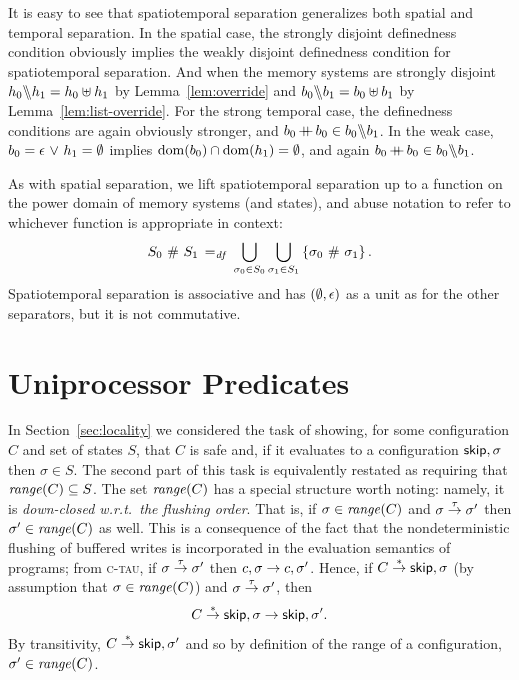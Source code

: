 \documentclass[11pt]{report}
\begin{document}
It is easy to see that spatiotemporal separation generalizes both spatial and temporal separation. In the spatial case, the strongly disjoint definedness condition obviously implies the weakly disjoint definedness condition for spatiotemporal separation. And when the memory systems are strongly disjoint $h_0 \backslash\!\!\backslash h_1 = h_0 \uplus h_1$ by Lemma~\ref{lem:override} and $b_0 \backslash\!\!\backslash b_1 = b_0 \uplus b_1$ by Lemma~\ref{lem:list-override}. For the strong temporal case, the definedness conditions are again obviously stronger, and $b_0 \operatorname{+\!\!\!+} b_0 \in b_0 \backslash\!\!\backslash b_1$. In the weak case, $b_0 = \epsilon \operatorname{\,\vee\,} h_1 = \operatorname{\emptyset}$ implies $\operatorname{\mathrm{dom}}(b_0) \cap \operatorname{\mathrm{dom}}(h_1) = \operatorname{\emptyset}$, and again $b_0 \operatorname{+\!\!\!+} b_0 \in b_0 \backslash\!\!\backslash b_1$. 

As with spatial separation, we lift spatiotemporal separation up to a function on the power domain of memory systems (and states), and abuse notation to refer to whichever function is appropriate in context: \[ S_0 \operatorname{\,\#\,} S_1 \operatorname{\;=_{\mathit{df}}\;} \bigcup_{\sigma_0 \in S_0} \bigcup_{\sigma_1 \in S_1} \left\lbrace \sigma_0 \operatorname{\,\#\,} \sigma_1 \right\rbrace.\] Spatiotemporal separation is associative and has $(\operatorname{\emptyset},\epsilon)$ as a unit as for the other separators, but it is not commutative. 


\section{Uniprocessor Predicates}
\label{sec:uniprocessor-predicates}

In Section~\ref{sec:locality} we considered the task of showing, for some configuration $C$ and set of states $S$, that $C$ is safe and, if it evaluates to a configuration $\operatorname{\mathsf{skip}},\sigma$ then $\sigma \in S$. The second part of this task is equivalently restated as requiring that $\mathit{range}(C) \subseteq S$. The set $\mathit{range}(C)$ has a special structure worth noting: namely, it is \emph{down-closed w.r.t.\ the flushing order}. That is, if $\sigma \in \mathit{range}(C)$ and $\sigma \stackrel{\tau}{\rightarrow} \sigma'$ then $\sigma' \in \mathit{range}(C)$ as well. This is a consequence of the fact that the nondeterministic flushing of buffered writes is incorporated in the evaluation semantics of programs; from \textsc{c-tau}, if $\sigma \stackrel{\tau}{\rightarrow} \sigma'$ then $c,\sigma \rightarrow c,\sigma'$. Hence, if $C \stackrel{\ast}{\rightarrow} \operatorname{\mathsf{skip}},\sigma$ (by assumption that $\sigma \in \mathit{range}(C)$) and $\sigma \stackrel{\tau}{\rightarrow} \sigma'$, then \[ C \stackrel{\ast}{\rightarrow} \operatorname{\mathsf{skip}},\sigma \rightarrow \operatorname{\mathsf{skip}},\sigma'.\] By transitivity, $C \stackrel{\ast}{\rightarrow} \operatorname{\mathsf{skip}},\sigma'$ and so by definition of the range of a configuration, $\sigma' \in \mathit{range}(C)$. 
  
\end{document}
